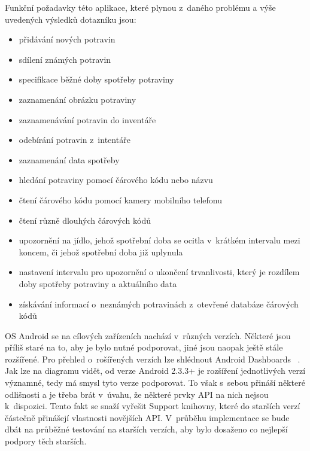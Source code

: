 \documentclass[thesis=B,czech]{FITthesis}[2013/10/20]
\begin{document}
Funkční požadavky této aplikace, které plynou z~daného problému a výše uvedených výsledků dotazníku jsou:

\begin{itemize}
  \item přidávání nových potravin
  \item sdílení známých potravin
  \item specifikace běžné doby spotřeby potraviny
  \item zaznamenání obrázku potraviny
  \item zaznamenávání potravin do inventáře
  \item odebírání potravin z~intentáře
  \item zaznamenání data spotřeby
  \item hledání potraviny pomocí čárového kódu nebo názvu
  \item čtení čárového kódu pomocí kamery mobilního telefonu
  \item čtení různě dlouhých čárových kódů
  \item upozornění na jídlo, jehož spotřební doba se ocitla v~krátkém intervalu mezi koncem, či jehož spotřební doba již uplynula
  \item nastavení intervalu pro upozornění o ukončení trvanlivosti, který je rozdílem doby spotřeby potraviny a aktuálního data
  \item získávání informací o~neznámých potravinách z~otevřené databáze čárových kódů
\end{itemize}

OS Android se na cílových zařízeních nachází v~různých verzích. Některé jsou příliš staré na to, aby je bylo nutné podporovat, jiné jsou naopak ještě stále rozšířené. Pro přehled o~rošířených verzích lze shlédnout Android Dashboards ~\cite{dashboards}. Jak lze na diagramu vidět, od verze Android 2.3.3+ je rozšíření jednotlivých verzí významné, tedy má smysl tyto verze podporovat. To však s~sebou přináší některé odlišnosti a je třeba brát v~úvahu, že některé prvky API na nich nejsou k~dispozici. Tento fakt se snaží vyřešit Support knihovny, které do starších verzí částečně přinášejí vlastnosti novějších API. V~průběhu implementace se bude dbát na průběžné testování na starších verzích, aby bylo dosaženo co nejlepší podpory těch starších.
\end{document}
